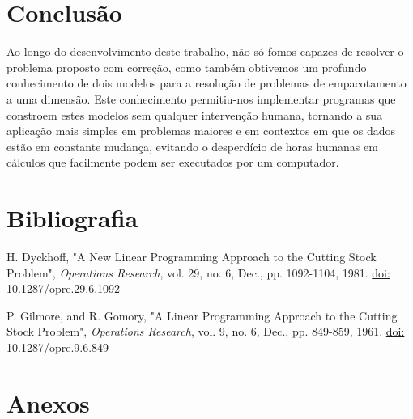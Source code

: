 \documentclass[12pt, a4paper, titlepage]{article}
\begin{document}
\section{Conclusão}

Ao longo do desenvolvimento deste trabalho, não só fomos capazes de resolver o problema proposto
com correção, como também obtivemos um profundo conhecimento de dois modelos para a resolução de
problemas de empacotamento a uma dimensão. Este conhecimento permitiu-nos implementar programas que
constroem estes modelos sem qualquer intervenção humana, tornando a sua aplicação mais simples em
problemas maiores e em contextos em que os dados estão em constante mudança, evitando o desperdício
de horas humanas em cálculos que facilmente podem ser executados por um computador.

\section{Bibliografia}
\def\refname{}
\vspace{-1.5cm}
\begin{thebibliography}{9}
    H. Dyckhoff, "A New Linear Programming Approach to the Cutting Stock Problem",
    \emph{Operations Research}, vol. 29, no. 6, Dec., pp. 1092-1104, 1981.
    \href{https://doi.org/10.1287/opre.29.6.1092}{doi: 10.1287/opre.29.6.1092}

    P. Gilmore, and R. Gomory, "A Linear Programming Approach to the Cutting Stock Problem",
    \emph{Operations Research}, vol. 9, no. 6, Dec., pp. 849-859, 1961.
    \href{https://doi.org/10.1287/opre.9.6.849}{doi: 10.1287/opre.9.6.849}
\end{thebibliography}

\section{Anexos}

\lstset{style=codestyle}
\end{document}
